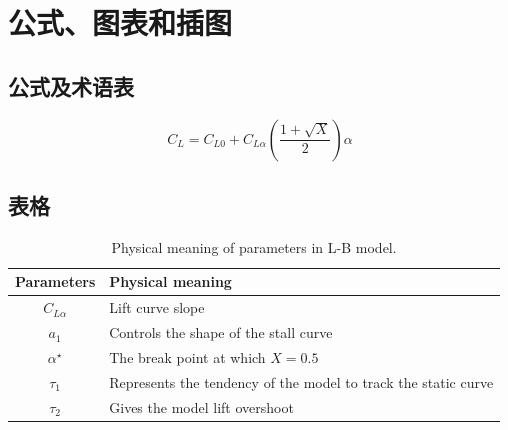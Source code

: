 
\chapter{公式、图表和插图}
\label{chap:eqnFigAndTab}

\section{公式及术语表}
\label{sec:eqn}

\begin{equation}
 \label{eqn:LBmodel}
   C_{L}=C_{L0}+C_{L\alpha }\left ( \frac{1+\sqrt{X}}{2} \right )\alpha 
\end{equation}
%
%
%
%
%
%
%
%
%

\section{表格}
\label{sec:tab}

\begin{table}                %
\centering
 \begin{center}
  \caption{Physical meaning of parameters in L-B model.\cite{Pattinson:2013_postall_oscillation}}
  \label{tab:LB-parameters}
  \begin{tabular}{cl}
       \\\hline
       Parameters & Physical meaning       \\\hline
       $C_{L\alpha}$ & Lift curve slope \\
       $a_{1}$ & Controls the shape of the stall curve \\
       $\alpha^{\star}$ & The break point at which $X=0.5$ \\
       $\tau_{1}$ & Represents the tendency of the model to track the static curve \\
       $\tau_{2}$ & Gives the model lift overshoot \\\hline
  \end{tabular}
 \end{center}
\end{table}

